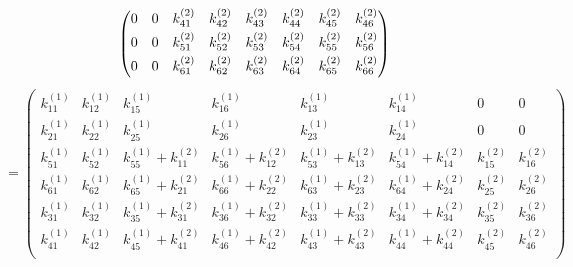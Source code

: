 \begin{equation*}
\begin{pmatrix}
0 & 0 & k_{41}^{\left(2\right)} & k_{42}^{\left(2\right)} &  k_{43}^{\left(2\right)} &  k_{44}^{\left(2\right)} & k_{45}^{\left(2\right)}  & k_{46}^{\left(2\right)}    \\[0.3em]
0 & 0 & k_{51}^{\left(2\right)} & k_{52}^{\left(2\right)} &  k_{53}^{\left(2\right)} &  k_{54}^{\left(2\right)} & k_{55}^{\left(2\right)}  & k_{56}^{\left(2\right)}   \\[0.3em]
0 & 0 & k_{61}^{\left(2\right)} & k_{62}^{\left(2\right)} &  k_{63}^{\left(2\right)} &  k_{64}^{\left(2\right)} & k_{65}^{\left(2\right)}  & k_{66}^{\left(2\right)}    \\[0.3em]
\end{pmatrix} \\
\end{equation*}
\begin{equation}
= \begin{pmatrix}
k_{11}^{\left(1\right)} & k_{12}^{\left(1\right)} &  k_{15}^{\left(1\right)} &  k_{16}^{\left(1\right)} & k_{13}^{\left(1\right)}  & k_{14}^{\left(1\right)} & 0 & 0   \\[0.3em]
k_{21}^{\left(1\right)} & k_{22}^{\left(1\right)} &  k_{25}^{\left(1\right)} &  k_{26}^{\left(1\right)} & k_{23}^{\left(1\right)}  & k_{24}^{\left(1\right)} & 0 & 0   \\[0.3em]
k_{51}^{\left(1\right)} & k_{52}^{\left(1\right)}  &k_{55}^{\left(1\right)}+k_{11}^{\left(2\right)} & k_{56}^{\left(1\right)}+k_{12}^{\left(2\right)} &  k_{53}^{\left(1\right)}+k_{13}^{\left(2\right)} &  k_{54}^{\left(1\right)}+k_{14}^{\left(2\right)} & k_{15}^{\left(2\right)}  & k_{16}^{\left(2\right)}   \\[0.3em]
k_{61}^{\left(1\right)} & k_{62}^{\left(1\right)} & k_{65}^{\left(1\right)}+k_{21}^{\left(2\right)} & k_{66}^{\left(1\right)}+k_{22}^{\left(2\right)} & k_{63}^{\left(1\right)}+ k_{23}^{\left(2\right)} &  k_{64}^{\left(1\right)}+k_{24}^{\left(2\right)} & k_{25}^{\left(2\right)}  & k_{26}^{\left(2\right)}   \\[0.3em]
k_{31}^{\left(1\right)} & k_{32}^{\left(1\right)} &k_{35}^{\left(1\right)}+ k_{31}^{\left(2\right)} & k_{36}^{\left(1\right)} + k_{32}^{\left(2\right)} & k_{33}^{\left(1\right)}+ k_{33}^{\left(2\right)} &  k_{34}^{\left(1\right)}+k_{34}^{\left(2\right)} & k_{35}^{\left(2\right)}  & k_{36}^{\left(2\right)}    \\[0.3em]
k_{41}^{\left(1\right)} & k_{42}^{\left(1\right)}&k_{45}^{\left(1\right)}+ k_{41}^{\left(2\right)} & k_{46}^{\left(1\right)}+k_{42}^{\left(2\right)} & k_{43}^{\left(1\right)}+ k_{43}^{\left(2\right)} &  k_{44}^{\left(1\right)}+k_{44}^{\left(2\right)} & k_{45}^{\left(2\right)}  & k_{46}^{\left(2\right)}    \\[0.3em]

\end{pmatrix}
\end{equation}
